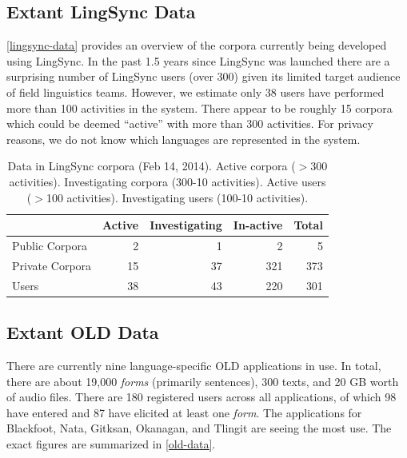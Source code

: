 \documentclass[11pt]{article}
\begin{document}
\subsection{Extant LingSync Data}

\autoref{lingsync-data} provides an overview of the corpora currently being
developed using LingSync. In the past 1.5 years since LingSync was launched
there are a surprising number of LingSync users (over 300) given its limited
target audience of field linguistics teams. However, we estimate only 38 users
have performed more than 100 activities in the system. There appear to be
roughly 15 corpora which could be deemed ``active'' with more than 300
activities. For privacy reasons, we do not know which languages are represented
in the system.

\begin{table}[h]
\begin{center}
\scriptsize
\begin{tabular}{lrrrr}
      \toprule
                     ~ &  Active & Investigating & In-active & Total\\
      \midrule
      Public Corpora  &       2 &   1 &   2 & 5 \\ 
      Private Corpora &      15 &  37 & 321 & 373\\ 
      Users           &      38 &  43 & 220 & 301 \\
      \bottomrule

\end{tabular}
\caption{Data in LingSync corpora (Feb 14, 2014).
Active corpora ($>$300 activities). Investigating corpora (300-10 activities). Active users ($>$100 activities). Investigating users (100-10 activities).}
\label{lingsync-data}
 \end{center}
 \normalsize
\end{table}



\subsection{Extant OLD Data}

There are currently nine language-specific OLD applications in use. In total,
there are about 19,000 \emph{forms} (primarily sentences), 300 texts, and 20 GB worth
of audio files.  There are 180 registered users across all applications, of
which 98 have entered and 87 have elicited at least one \emph{form}. The applications
for Blackfoot, Nata, Gitksan, Okanagan, and Tlingit are seeing the most use. The
exact figures are summarized in \autoref{old-data}.
\end{document}

